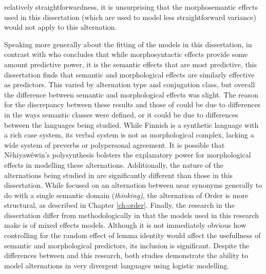 relatively straightforwardness, it is unsurprising that the morphosemantic effects used in this dissertation (which are used to model less straightforward variance) would not apply to this alternation.


Speaking more generally about the fitting of the models in this dissertation, in contrast with \citet{arppe2008univariate} who concludes that while morphosyntactic effects provide some amount predictive power, it is the semantic effects that are most predictive, this dissertation finds that semantic and morphological effects are similarly effective as predictors. This varied by alternation type and conjugation class, but overall the difference between semantic and morphological effects was slight. The reason for the discrepancy between these results and those of \citet{arppe2008univariate} could be due to differences in the ways semantic classes were defined, or it could be due to differences between the languages being studied. While Finnish is a synthetic language with a rich case system, its verbal system is not as morphological complex, lacking a wide system of preverbs or polypersonal agreement. It is possible that Nêhiyawêwin's polysynthesis bolsters the explanatory power for morphological effects in modelling these alternations. Additionally, the nature of the alternations being studied in \citet{arppe2008univariate} are significantly different than those in this dissertation. While \citet{arppe2008univariate} focused on an alternation between near synonyms generally to do with a single semantic domain (\textit{thinking)}, the alternation of Order is more structural, as described in Chapter \ref{ch:order}. Finally, the research in the dissertation differ from \citet{arppe2008univariate} methodologically in that the models used in this research make is of mixed effects models. Although it is not immediately obvious how controlling for the random effect of lemma identity would affect the usefullness of semantic and morphological predictors, its inclusion is significant. Despite the differences between \citet{arppe2008univariate} and this research, both studies demonstrate the ability to model alternations in very divergent languages using logistic modelling.

